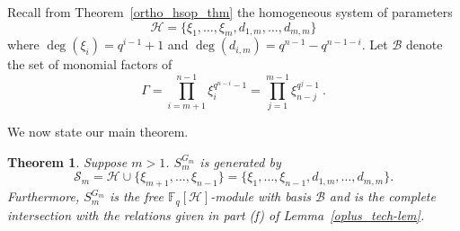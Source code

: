 \documentclass{amsart}
\newcommand{\field}{\mathbb{F}}
\newcommand{\cS}{\mathcal{S}}
\newcommand{\HH}{\mathcal{H}}
\newcommand{\B}{\mathcal{B}}
\newtheorem{thm}[subsection]{Theorem}
\begin{document}
Recall from Theorem~\ref{ortho_hsop_thm} the homogeneous system of parameters
$$\HH=\{\xi_1,\ldots,\xi_{m},d_{1,m},\ldots,d_{m,m}\}$$ 
where $\deg(\xi_i)=q^{i-1}+1$ and $\deg(d_{i,m})=q^{n-1}-q^{n-1-i}$. Let 
$\B$ denote the set of monomial factors of 
$$\Gamma=\prod_{i=m+1}^{n-1}\xi_{i}^{q^{n-i}-1}= \prod_{j=1}^{m-1}\xi_{n-j}^{q^j-1}\ .$$ 

We now state our main theorem.

\begin{thm} \label{oplus_thm_v2} 
Suppose $m>1$. $S_m^{G_m}$ is generated by 
$$\cS_m=\HH\cup\{\xi_{m+1},\ldots,\xi_{n-1}\}
=\{\xi_1,\ldots,\xi_{n-1},d_{1,m},\ldots,d_{m,m}\}.$$ 
Furthermore, $S_m^{G_m}$ is the free $\field_q[\HH]$-module with basis $\B$ and is the complete intersection with the relations given in part (f) of 
Lemma~\ref{oplus_tech-lem}.
\end{thm}
\end{document}
